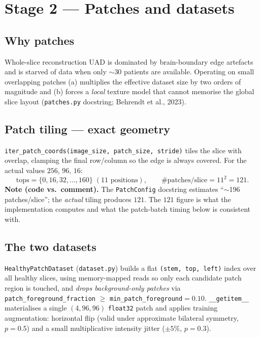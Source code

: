 \documentclass[11pt,a4paper]{article}
\newcommand{\code}[1]{\texttt{\small #1}}
\begin{document}
\section{Stage 2 — Patches and datasets}

\subsection{Why patches}
Whole-slice reconstruction UAD is dominated by brain-boundary edge artefacts and
is starved of data when only $\sim$30 patients are available. Operating on small
overlapping patches (a) multiplies the effective dataset size by two orders of
magnitude and (b) forces a \emph{local} texture model that cannot memorise the
global slice layout (\code{patches.py} docstring; Behrendt et al., 2023).

\subsection{Patch tiling --- exact geometry}
\code{iter\_patch\_coords(image\_size, patch\_size, stride)} tiles the slice with
overlap, clamping the final row/column so the edge is always covered. For the
actual values $256$, $96$, $16$:
\[
\text{tops} = \{0,16,32,\dots,160\}\;(11\text{ positions}),
\qquad \#\text{patches/slice} = 11^2 = \boxed{121}.
\]
\textbf{Note (code vs.\ comment).} The \code{PatchConfig} docstring estimates
``$\sim$196 patches/slice''; the \emph{actual} tiling produces $121$. The $121$
figure is what the implementation computes and what the patch-batch timing below
is consistent with.

\subsection{The two datasets}
\code{HealthyPatchDataset} (\code{dataset.py}) builds a flat
\code{(stem, top, left)} index over all healthy slices, using memory-mapped reads
so only each candidate patch region is touched, and \emph{drops background-only
patches} via \code{patch\_foreground\_fraction} $\ge$
\code{min\_patch\_foreground}$=0.10$. \code{\_\_getitem\_\_} materialises a single
$(4,96,96)$ \code{float32} patch and applies training augmentation:
horizontal flip (valid under approximate bilateral symmetry, $p{=}0.5$) and a
small multiplicative intensity jitter ($\pm5\%$, $p{=}0.3$).
\end{document}
